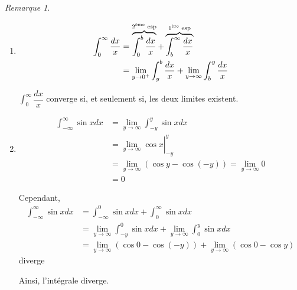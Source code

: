 \documentclass{report}
\newcommand*{\dlim}[3]{\displaystyle\lim_{#1 \to #2}#3}
\newcommand*{\dint}[3]{\displaystyle\int_{#1}^{#2}#3}
\theoremstyle{definition}
\theoremstyle{remark}
\newtheorem*{rema}{Remarque}
\begin{document}
	\begin{rema}~

		\begin{enumerate}
			\item \begin{align*}
				\dint{0}{\infty}{\dfrac{dx}{x}}&= \overbrace{\dint{0}{b}{\dfrac{dx}{x}}}^{\text{2\textsuperscript{\`eme} esp}} + \overbrace{\dint{b}{\infty}{\dfrac{dx}{x}}}^{\text{1\textsuperscript{\`ere} esp}}\\
				&= \dlim{y}{0^+}{\dint{y}{b}{\dfrac{dx}{x}}} + \dlim{y}{\infty}{\dint{b}{y}{\dfrac{dx}{x}}}
			\end{align*}

			$\dint{0}{\infty}{\dfrac{dx}{x}}$ converge si, et seulement si, les deux limites existent.
			\item \begin{align*}
				\dint{-\infty}{\infty}{\sin xdx}&= \dlim{y}{\infty}{\dint{-y}{y}{\sin xdx}}\\
				&= \left. \dlim{y}{\infty}{\cos x} \right|^y_{-y}\\
				&= \dlim{y}{\infty}{(\cos y - \cos (-y))} = \dlim{y}{\infty}{0}\\
				&= 0
			\end{align*}

			Cependant,
			\begin{align*}
				\dint{-\infty}{\infty}{\sin xdx}&= \dint{-\infty}{0}{\sin xdx} + \dint{0}{\infty}{\sin xdx}\\
				&= \dlim{y}{\infty}{\dint{-y}{0}{\sin xdx}} + \dlim{y}{\infty}{\dint{0}{y}{\sin xdx}}\\
				&= \dlim{y}{\infty}{(\cos0-\cos(-y))} + \dlim{y}{\infty}{(\cos0-\cos y)}
			\end{align*}
			diverge

			Ainsi, l'int\'egrale diverge.
		\end{enumerate}
	\end{rema}
\end{document}

